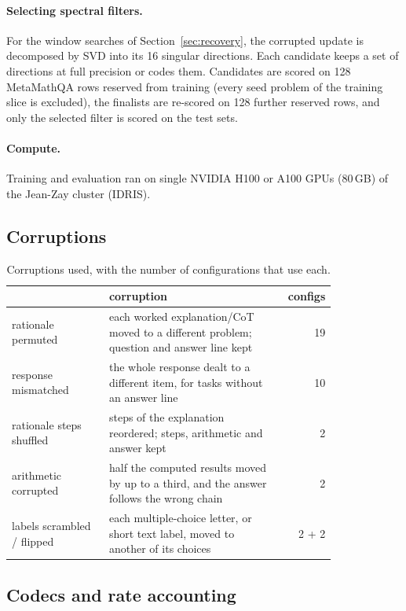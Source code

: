 \paragraph{Selecting spectral filters.} For the window searches of Section~\ref{sec:recovery}, the corrupted update is decomposed by SVD into its 16 singular directions. Each candidate keeps a set of directions at full precision or codes them. Candidates are scored on 128 MetaMathQA rows reserved from training (every seed problem of the training slice is excluded), the finalists are re-scored on 128 further reserved rows, and only the selected filter is scored on the test sets.

\paragraph{Compute.} Training and evaluation ran on single NVIDIA H100 or A100 GPUs (80\,GB) of the Jean-Zay cluster (IDRIS).

\subsection{Corruptions}
\label{app:corruptions}

\begin{table}[h]
\caption{Corruptions used, with the number of configurations that use each.}
\label{tab:corruptions}
\centering
\small
\begin{tabular}{p{0.3\linewidth}p{0.52\linewidth}r}
\toprule
 & corruption & configs \\
\midrule
rationale permuted & each worked explanation/CoT moved to a different problem; question and answer line kept & 19 \\
response mismatched & the whole response dealt to a different item, for tasks without an answer line & 10 \\
rationale steps shuffled & steps of the explanation reordered; steps, arithmetic and answer kept & 2 \\
arithmetic corrupted & half the computed results moved by up to a third, and the answer follows the wrong chain & 2 \\
labels scrambled / flipped & each multiple-choice letter, or short text label, moved to another of its choices & 2 + 2 \\
\bottomrule
\end{tabular}
\end{table}


\subsection{Codecs and rate accounting}
\label{app:codecs}

